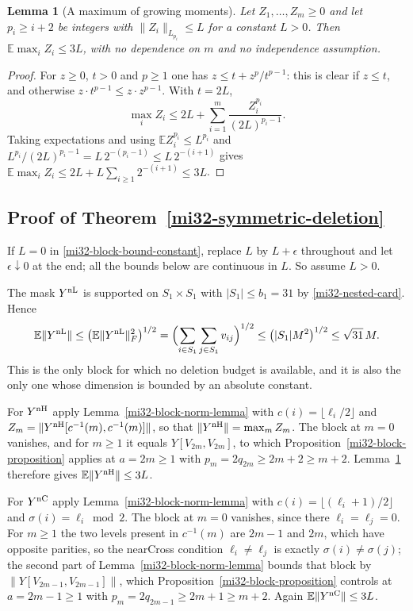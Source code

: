 \documentclass[11pt]{article}
\newtheorem{lemma}[theorem]{Lemma}
\theoremstyle{definition}
\theoremstyle{remark}
\newcommand{\E}{\mathbb E}
\newcommand{\norm}[1]{\lVert#1\rVert}
\begin{document}
\begin{lemma}[A maximum of growing moments]
\label{mi32-max-lemma}
Let $Z_1,\ldots,Z_m\ge0$ and let $p_i\ge i+2$ be integers with
$\norm{Z_i}_{L_{p_i}}\le L$ for a constant $L>0$. Then
$\E\max_iZ_i\le3L$, with no dependence on $m$ and no independence
assumption.
\end{lemma}
\begin{proof}
For $z\ge0$, $t>0$ and $p\ge1$ one has
$z\le t+z^p/t^{p-1}$: this is clear if $z\le t$, and otherwise
$z\cdot t^{p-1}\le z\cdot z^{p-1}$. With $t=2L$,
\[
 \max_iZ_i\le2L+\sum_{i=1}^m\frac{Z_i^{p_i}}{(2L)^{p_i-1}} .
\]
Taking expectations and using $\E Z_i^{p_i}\le L^{p_i}$ and
$L^{p_i}/(2L)^{p_i-1}=L\,2^{-(p_i-1)}\le L\,2^{-(i+1)}$ gives
$\E\max_iZ_i\le2L+L\sum_{i\ge1}2^{-(i+1)}\le3L$.
\end{proof}

\subsection{Proof of Theorem~\ref{mi32-symmetric-deletion}}

If $L=0$ in \eqref{mi32-block-bound-constant}, replace $L$ by
$L+\epsilon$ throughout and let $\epsilon\downarrow0$ at the end; all
the bounds below are continuous in $L$. So assume $L>0$.

The mask $Y^{\rm nL}$ is supported on $S_1\times S_1$ with
$|S_1|\le b_1=31$ by \eqref{mi32-nested-card}. Hence
\begin{equation}\label{mi32-nearlow-bound}
 \E\norm{Y^{\rm nL}}
 \le\bigl(\E\norm{Y^{\rm nL}}_F^2\bigr)^{1/2}
 =\Bigl(\sum_{i\in S_1}\sum_{j\in S_1}v_{ij}\Bigr)^{1/2}
 \le\bigl(|S_1|M^2\bigr)^{1/2}\le\sqrt{31}\,M .
\end{equation}
This is the only block for which no deletion budget is available, and it
is also the only one whose dimension is bounded by an absolute
constant.

For $Y^{\rm nH}$ apply Lemma~\ref{mi32-block-norm-lemma} with
$c(i)=\lfloor\ell_i/2\rfloor$ and
$Z_m=\norm{Y^{\rm nH}[c^{-1}(m),c^{-1}(m)]}$, so that
$\norm{Y^{\rm nH}}=\max_mZ_m$. The block at $m=0$ vanishes, and for
$m\ge1$ it equals $Y[V_{2m},V_{2m}]$, to which
Proposition~\ref{mi32-block-proposition} applies at $a=2m\ge1$ with
$p_m=2q_{2m}\ge2m+2\ge m+2$. Lemma~\ref{mi32-max-lemma} therefore gives
$\E\norm{Y^{\rm nH}}\le3L$.

For $Y^{\rm nC}$ apply Lemma~\ref{mi32-block-norm-lemma} with
$c(i)=\lfloor(\ell_i+1)/2\rfloor$ and
$\sigma(i)=\ell_i\bmod2$. The block at $m=0$ vanishes, since there
$\ell_i=\ell_j=0$. For $m\ge1$ the two levels present in $c^{-1}(m)$
are $2m-1$ and $2m$, which have opposite parities, so the nearCross
condition $\ell_i\ne\ell_j$ is exactly $\sigma(i)\ne\sigma(j)$; the
second part of Lemma~\ref{mi32-block-norm-lemma} bounds that block by
$\norm{Y[V_{2m-1},V_{2m-1}]}$, which
Proposition~\ref{mi32-block-proposition} controls at $a=2m-1\ge1$ with
$p_m=2q_{2m-1}\ge2m+1\ge m+2$. Again
$\E\norm{Y^{\rm nC}}\le3L$.
\end{document}
